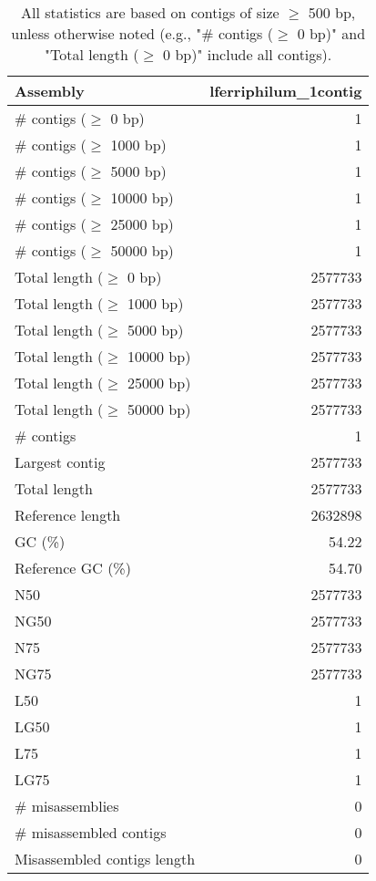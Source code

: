 \documentclass[12pt,a4paper]{article}
\begin{document}
\begin{table}[ht]
\begin{center}
\caption{All statistics are based on contigs of size $\geq$ 500 bp, unless otherwise noted (e.g., "\# contigs ($\geq$ 0 bp)" and "Total length ($\geq$ 0 bp)" include all contigs).}
\begin{tabular}{|l*{1}{|r}|}
\hline
Assembly & lferriphilum\_1contig \\ \hline
\# contigs ($\geq$ 0 bp) & 1 \\ \hline
\# contigs ($\geq$ 1000 bp) & 1 \\ \hline
\# contigs ($\geq$ 5000 bp) & 1 \\ \hline
\# contigs ($\geq$ 10000 bp) & 1 \\ \hline
\# contigs ($\geq$ 25000 bp) & 1 \\ \hline
\# contigs ($\geq$ 50000 bp) & 1 \\ \hline
Total length ($\geq$ 0 bp) & 2577733 \\ \hline
Total length ($\geq$ 1000 bp) & 2577733 \\ \hline
Total length ($\geq$ 5000 bp) & 2577733 \\ \hline
Total length ($\geq$ 10000 bp) & 2577733 \\ \hline
Total length ($\geq$ 25000 bp) & 2577733 \\ \hline
Total length ($\geq$ 50000 bp) & 2577733 \\ \hline
\# contigs & 1 \\ \hline
Largest contig & 2577733 \\ \hline
Total length & 2577733 \\ \hline
Reference length & 2632898 \\ \hline
GC (\%) & 54.22 \\ \hline
Reference GC (\%) & 54.70 \\ \hline
N50 & 2577733 \\ \hline
NG50 & 2577733 \\ \hline
N75 & 2577733 \\ \hline
NG75 & 2577733 \\ \hline
L50 & 1 \\ \hline
LG50 & 1 \\ \hline
L75 & 1 \\ \hline
LG75 & 1 \\ \hline
\# misassemblies & 0 \\ \hline
\# misassembled contigs & 0 \\ \hline
Misassembled contigs length & 0 \\ \hline

\end{tabular}
\end{center}
\end{table}
\end{document}
